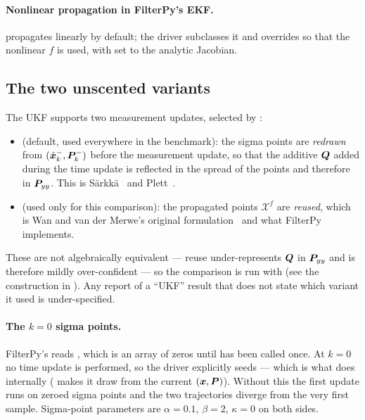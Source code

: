 \paragraph{Nonlinear propagation in FilterPy's EKF.} 
propagates linearly by default; the driver subclasses it and overrides  so that the
nonlinear $f$ is used, with  set to the analytic Jacobian.

\subsection{The two unscented variants}

The  UKF supports two measurement updates, selected by
:

\begin{itemize}[leftmargin=*,topsep=2pt,itemsep=2pt]
\item {} (default, used everywhere in the benchmark): the sigma points are \emph{redrawn}
from $(\hat{\bm{x}}^{-}_k,\bm{P}^{-}_k)$ before the measurement update, so that the additive $\bm{Q}$ added during
the time update is reflected in the spread of the points and therefore in $\bm{P}_{yy}$. This is
Särkkä~\cite[Alg.~5.14]{sarkka2013} and Plett~\cite{plett2006spkf1}.
\item {} (used only for this comparison): the propagated points $\mathcal{X}^f$ are
\emph{reused}, which is Wan and van der Merwe's original formulation~\cite[Alg.~3.1]{wan2000ukf}
and what FilterPy implements.
\end{itemize}

These are not algebraically equivalent --- reuse under-represents $\bm{Q}$ in $\bm{P}_{yy}$ and is
therefore mildly over-confident --- so the comparison is run with
 (see the  construction in
). Any report of a ``UKF'' result that does not state which
variant it used is under-specified.

\paragraph{The $k=0$ sigma points.} FilterPy's  reads
, which is an array of zeros until  has been called once. At
$k=0$ no time update is performed, so the driver explicitly seeds
 --- which is what  does internally
( makes it draw from the current $(\bm{x},\bm{P})$). Without this the
first update runs on zeroed sigma points and the two trajectories diverge from the very first
sample. Sigma-point parameters are $\alpha = 0.1$, $\beta = 2$, $\kappa = 0$ on both sides.


